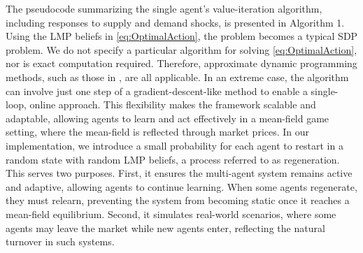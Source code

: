 \documentclass{article}
\theoremstyle{definition}
\theoremstyle{plain}
\begin{document}
The pseudocode summarizing the single agent's value-iteration algorithm, including responses to supply and demand shocks, is presented in Algorithm 1. Using the LMP beliefs in \eqref{eq:OptimalAction}, the problem becomes a typical SDP problem. We do not specify a particular algorithm for solving \eqref{eq:OptimalAction}, nor is exact computation required. Therefore, approximate dynamic programming methods, such as those in \cite{BertsekasDP, Powell}, are all applicable. In an extreme case, the algorithm can involve just one step of a gradient-descent-like method to enable a single-loop, online approach. This flexibility makes the framework scalable and adaptable, allowing agents to learn and act effectively in a mean-field game setting, where the mean-field is reflected through market prices. In our implementation, we introduce a small probability for each agent to restart in a random state with random LMP beliefs, a process referred to as regeneration. This serves two purposes. First, it ensures the multi-agent system remains active and adaptive, allowing agents to continue learning. When some agents regenerate, they must relearn, preventing the system from becoming static once it reaches a mean-field equilibrium. Second, it simulates real-world scenarios, where some agents may leave the market while new agents enter, reflecting the natural turnover in such systems.
\end{document}
